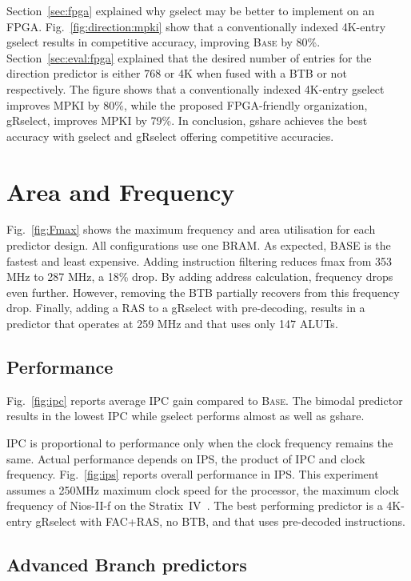 
Section~\ref{sec:fpga} explained why gselect may be better to implement on an FPGA. Fig.~\ref{fig:direction:mpki} show that a conventionally indexed 4K-entry gselect results in competitive accuracy, improving \textsc{Base} by 80\%. Section~\ref{sec:eval:fpga} explained that the desired number of entries for the direction predictor is either 768  or 4K when  fused with a  BTB or not respectively. The figure shows that a conventionally indexed 4K-entry gselect improves MPKI by 80\%, while the proposed FPGA-friendly organization, gRselect, improves MPKI by 79\%.
In conclusion, gshare achieves the best accuracy with gselect and gRselect offering competitive accuracies.

\section{Area and Frequency}
\label{sec:eval:min:fmax}

Fig.~\ref{fig:Fmax} shows the maximum frequency and area utilisation for each predictor design. All configurations use one BRAM. As expected, BASE is the fastest and least expensive. Adding instruction filtering reduces fmax from 353 MHz to 287 MHz, a 18\% drop. By adding address calculation, frequency drops even further. However, removing the BTB partially recovers from this frequency drop. Finally, adding a RAS to a gRselect with pre-decoding, results in a predictor that operates at 259 MHz and that uses only 147 ALUTs.

\subsection{Performance}
\label{sec:eval:performance}

Fig.~\ref{fig:ipc} reports  average IPC gain compared to \textsc{Base}. The bimodal predictor results in the lowest IPC  while gselect performs almost as well as gshare.


IPC is proportional to performance only when the clock frequency remains the same. Actual performance depends  on IPS, the product of IPC and clock frequency. Fig.~\ref{fig:ips} reports overall performance in IPS. This experiment assumes a 250MHz maximum clock speed for the processor, the maximum clock frequency of Nios-II-f on the Stratix~IV~\cite{niosfmax}. The best performing predictor is a 4K-entry gRselect with FAC+RAS, no BTB, and that uses pre-decoded instructions.



\subsection{Advanced Branch predictors}
\label{sec:eval:advanced}










